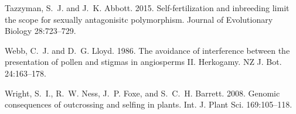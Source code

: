 \documentclass{article}
\begin{document}
\begin{thebibliography}{}
Tazzyman, S.~J. and J.~K. Abbott. 2015.
\newblock Self-fertilization and inbreeding limit the scope for sexually antagonisitc polymorphism.
\newblock Journal of Evolutionary Biology 28:723--729.

Webb, C.~J. and D.~G. Lloyd. 1986.
\newblock The avoidance of interference between the presentation of pollen and stigmas in angiosperms II. Herkogamy.
\newblock NZ J. Bot. 24:163--178.

Wright, S.~I., R.~W. Ness, J.~P. Foxe, and S.~C.~H. Barrett. 2008.
\newblock Genomic consequences of outcrossing and selfing in plants.
\newblock Int. J. Plant Sci. 169:105--118.



\end{thebibliography}
\end{document}
